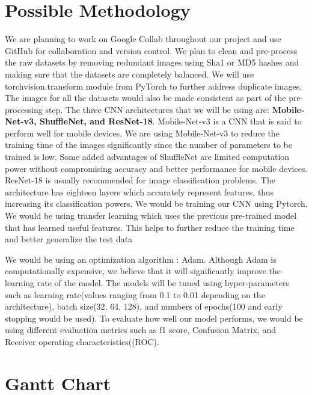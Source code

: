 \documentclass[10pt,twocolumn,letterpaper]{article}
\begin{document}
  \section{Possible Methodology}
We are planning to work on Google Collab throughout our project and use GitHub for collaboration and version control. We plan to clean and pre-process the raw datasets by removing redundant images using Sha1 or MD5 hashes and making sure that the datasets are completely balanced. We will use \cite{TV}torchvision.transform module from PyTorch to further address duplicate images. The images for all the datasets would also be made consistent as part of the pre-processing step. The three CNN architectures that we will be using are: \textbf{Mobile-Net-v3, ShuffleNet, and ResNet-18}. Mobile-Net-v3\cite{MNV3} is a CNN\cite{NNC} that is said to perform well for mobile devices. We are using Mobile-Net-v3 to reduce the training time of the images significantly since the number of parameters to be trained is low. Some added advantages of ShuffleNet\cite{SN1} are limited computation power without compromising accuracy and better performance for mobile devices.\cite{RN18} ResNet-18 is usually recommended for image classification problems. The architecture has eighteen layers which accurately represent features, thus increasing its classification powers. We would be training our CNN using Pytorch. We would be using transfer learning which uses the previous pre-trained model that has learned useful features. This helps to further reduce the training time and better generalize the test data\par We would be using an optimization algorithm\cite{OA} : Adam. Although Adam is computationally expensive, we believe that it will significantly improve the learning rate of the model. The models will be tuned using hyper-parameters such as learning rate(values ranging from 0.1 to 0.01 depending on the architecture), batch size(32, 64, 128), and numbers of epochs(100 and early stopping would be used). To evaluate how well our model performs, we would be using different evaluation metrics such as\cite{M} f1 score, Confusion Matrix, and Receiver operating characteristics((ROC).

\pagebreak

  \onecolumn
  \section{Gantt Chart}
    \vspace{1\baselineskip}
\end{document}
